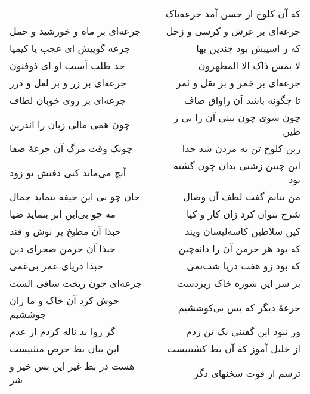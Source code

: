 \begin{center}
\begin{longtable}{l p{0.5cm} r}
&&
که آن کلوخ از حسن آمد جرعه‌ناک
\\
جرعه‌ای بر ماه و خورشید و حمل
&&
جرعه‌ای بر عرش و کرسی و زحل
\\
جرعه گوییش ای عجب یا کیمیا
&&
که ز اسیبش بود چندین بها
\\
جد طلب آسیب او ای ذوفنون
&&
لا یمس ذاک الا المطهرون
\\
جرعه‌ای بر زر و بر لعل و درر
&&
جرعه‌ای بر خمر و بر نقل و ثمر
\\
جرعه‌ای بر روی خوبان لطاف
&&
تا چگونه باشد آن راواق صاف
\\
چون همی مالی زبان را اندرین
&&
چون شوی چون بینی آن را بی ز طین
\\
چونک وقت مرگ آن جرعهٔ صفا
&&
زین کلوخ تن به مردن شد جدا
\\
آنچ می‌ماند کنی دفنش تو زود
&&
این چنین زشتی بدان چون گشته بود
\\
جان چو بی این جیفه بنماید جمال
&&
من نتانم گفت لطف آن وصال
\\
مه چو بی‌این ابر بنماید ضیا
&&
شرح نتوان کرد زان کار و کیا
\\
حبذا آن مطبخ پر نوش و قند
&&
کین سلاطین کاسه‌لیسان ویند
\\
حبذا آن خرمن صحرای دین
&&
که بود هر خرمن آن را دانه‌چین
\\
حبذا دریای عمر بی‌غمی
&&
که بود زو هفت دریا شب‌نمی
\\
جرعه‌ای چون ریخت ساقی الست
&&
بر سر این شوره خاک زیردست
\\
جوش کرد آن خاک و ما زان جوششیم
&&
جرعهٔ دیگر که بس بی‌کوششیم
\\
گر روا بد ناله کردم از عدم
&&
ور نبود این گفتنی نک تن زدم
\\
این بیان بط حرص منثنیست
&&
از خلیل آموز که آن بط کشتنیست
\\
هست در بط غیر این بس خیر و شر
&&
ترسم از فوت سخنهای دگر
\\
\end{longtable}
\end{center}

